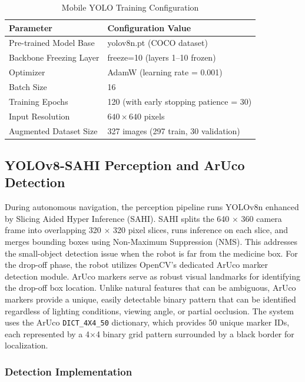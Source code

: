 \documentclass[12pt,a4paper,oneside]{report}
\begin{document}
\begin{table}[htbp]
\centering
\caption{Mobile YOLO Training Configuration\label{tab:table13}}
\begin{tabular}{ll}
\toprule
\textbf{Parameter} & \textbf{Configuration Value} \\
\midrule
Pre-trained Model Base & yolov8n.pt (COCO dataset) \\
Backbone Freezing Layer & freeze=10 (layers 1--10 frozen) \\
Optimizer & AdamW (learning rate = 0.001) \\
Batch Size & 16 \\
Training Epochs & 120 (with early stopping patience = 30) \\
Input Resolution & $640 \times 640$ pixels \\
Augmented Dataset Size & 327 images (297 train, 30 validation) \\
\bottomrule
\end{tabular}
\end{table}

\subsection{YOLOv8-SAHI Perception and ArUco
Detection}\label{yolov8-sahi-perception-and-aruco-detection}

During autonomous navigation, the perception pipeline runs YOLOv8n
enhanced by Slicing Aided Hyper Inference (SAHI). SAHI splits the 640
\emph{$\times$} 360 camera frame into overlapping 320 \emph{$\times$} 320 pixel
slices, runs inference on each slice, and merges bounding boxes using
Non-Maximum Suppression (NMS). This addresses the small-object detection
issue when the robot is far from the medicine box. For the drop-off phase, the robot utilizes OpenCV's dedicated ArUco marker detection module. ArUco markers serve as robust visual landmarks for identifying the drop-off box location. Unlike natural features that can be ambiguous, ArUco markers provide a unique, easily detectable binary pattern that can be identified regardless of lighting conditions, viewing angle, or partial occlusion. The system uses the ArUco \texttt{DICT\_4X4\_50} dictionary, which provides 50 unique marker IDs, each represented by a 4\emph{$\times$}4 binary grid pattern surrounded by a black border for localization.

\subsubsection{Detection Implementation}\label{detection-implementation}
\end{document}

